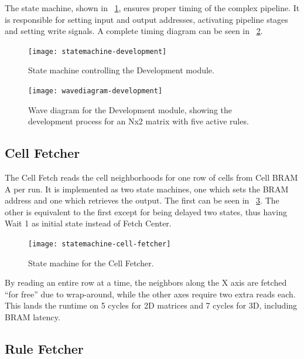 The state machine, shown in \figurename~\ref{fig:statemachine-development}, ensures proper timing of the complex pipeline.
It is responsible for setting input and output addresses, activating pipeline stages and setting write signals.
A complete timing diagram can be seen in \figurename~\ref{fig:wavediagram-development}.

\begin{figure}[!ht]
    \centering
    \texttt{[image: statemachine-development]}
    \caption[Development module state machine]{
        State machine controlling the Development module.
    }
    \label{fig:statemachine-development}
\end{figure}

\begin{figure}
    \centering
    \texttt{[image: wavediagram-development]}
    \caption[Development module wave diagram]{
        Wave diagram for the Development module, showing the development process for an Nx2 matrix with five active rules.
    }
    \label{fig:wavediagram-development}
\end{figure}

\subsection{Cell Fetcher}

The Cell Fetch reads the cell neighborhoods for one row of cells from Cell BRAM A per run.
It is implemented as two state machines, one which sets the BRAM address and one which retrieves the output.
The first can be seen in \figurename~\ref{fig:statemachine-cell-fetcher}.
The other is equivalent to the first except for being delayed two states, thus having Wait 1 as initial state instead of Fetch Center.

\begin{figure}[!ht]
    \centering
    \texttt{[image: statemachine-cell-fetcher]}
    \caption[Cell Fetcher state machine]{
        State machine for the Cell Fetcher.
    }
    \label{fig:statemachine-cell-fetcher}
\end{figure}

By reading an entire row at a time, the neighbors along the X axis are fetched ``for free'' due to wrap-around, while the other axes require two extra reads each.
This lands the runtime on 5 cycles for 2D matrices and 7 cycles for 3D, including BRAM latency.

\subsection{Rule Fetcher}

